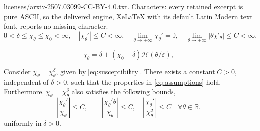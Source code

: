\documentclass[10pt,a4paper]{amsart}
\newcommand{\R}{\mathbb{R}}
\newcommand{\eps}{\varepsilon}
\begin{document}
licenses/arxiv-2507.03099-CC-BY-4.0.txt. Characters: every retained excerpt is pure ASCII, so the delivered engine, XeLaTeX with its default Latin Modern text font, reports no missing character.
\begin{equation}\label{eq:assumptions}
	0<\delta\leq \chi_\theta\leq \chi_0<\infty,\quad |\chi_\theta'|\leq C<\infty,\quad \lim_{\theta\to\pm\infty}\chi_\theta' = 0,\quad \lim_{\theta\to\pm\infty}|\theta\chi'_\theta|\leq C<\infty.
\end{equation}

\begin{equation}\label{eq:susceptibility}
	\chi_\theta = \delta+(\chi_0-\delta)\mathcal{H}(\theta/\eps),
\end{equation}

\begin{lemma}
\label{lem:heavyside}
Consider $\chi_\theta = \chi^\delta_\theta$, given by \eqref{eq:susceptibility}. There exists a constant $C>0$, independent of $\delta>0$, such that the properties in \eqref{eq:assumptions} hold. Furthermore, $\chi_\theta = \chi^\delta_\theta$ also satisfies the following bounds,
\begin{equation}\label{eq:heavysidelemma}
\left| \frac{\chi_\theta'}{\chi_{\theta}}\right|\leq C, 
\qquad  \left| \frac{\chi_\theta' \theta}{\chi_{\theta}}\right|\leq C,
\quad \left|\frac{\chi_\theta'}{\chi_{\theta}^2}\right|\leq C \quad \forall  \theta\in\R.
\end{equation}
uniformly in $\delta>0$.
\end{lemma}
\end{document}
